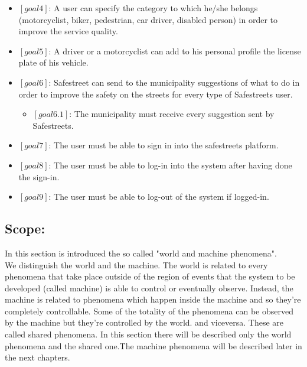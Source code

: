 \documentclass[titlepage]{article}
\begin{document}
\begin{itemize}
\item $[goal 4]$: A user can specify the category to which 						  he/she belongs (motorcyclist, biker, 							  pedestrian, car driver, disabled person) in 				  order to improve the service quality.\\

\item $[goal 5]$: A driver or a motorcyclist can add to his 					  personal profile the license plate of his 					  vehicle.\\

\item $[goal 6]$: Safestreet can send to the municipality 						  suggestions of what to do in order to 						  improve the safety on the streets for every 
				  type of Safestreets user.
	\begin{itemize}
	\item $[goal 6.1]$: The municipality must receive every 
					    suggestion sent by Safestreets.\\
					   
	
	\end{itemize}
\item $[goal 7]$: The user must be able to sign in into the safestreets platform.
\item $[goal 8]$: The user must be able to log-in into the system after having done the sign-in.
\item $[goal 9]$: The user must be able to log-out of the system if logged-in.
\end{itemize}

\subsection{Scope:}
In this section is introduced the so called "world and machine phenomena".\\
We distinguish the world and the machine. The world is related to every phenomena that take place outside of the region of events that the system to be developed (called machine) is able to control or eventually observe. Instead, the machine is related to phenomena which happen inside the machine and so they're completely controllable. Some of the totality of the phenomena can be observed by the machine but they're controlled by the world.  and viceversa. These are called shared phenomena. In this section there will be described only the world phenomena and the shared one.The machine phenomena will be described later in the next chapters.
\end{document}
